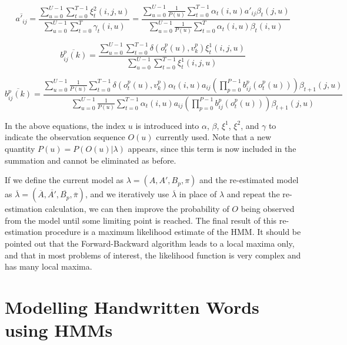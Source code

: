 \documentclass{article}[14pt, oneside, a4paper, times]
\begin{document}
\begin{equation}
    \overline{a'_{ij}} =
        \frac{ \sum_{u=0}^{U-1} \sum_{t=0}^{T-1} \xi_t^2(i,j,u) }
             { \sum_{u=0}^{U-1} \sum_{t=0}^T \gamma_t(i,u)} =
        \frac{ \sum_{u=0}^{U-1} \frac{1} {P(u)} \sum_{t=0}^{T-1} \alpha_t(i,u) a'_{ij} \beta_t(j,u) }
             { \sum_{u=0}^{U-1} \frac{1} {P(u)} \sum_{t=0}^T \alpha_t(i,u) \beta_t(i,u) }
    \label{EQ:a2-3}
\end{equation}

\begin{equation}
    \overline{b_{ij}^p(k)} =
        \frac{ \sum_{u=0}^{U-1} \sum_{t=0}^{T-1} \delta(o_t^p(u), v_k^p) \xi_t^1(i,j,u) }
             { \sum_{u=0}^{U-1} \sum_{t=0}^{T-1} \xi_t^1(i,j,u)}
    \label{EQ:b-3}
\end{equation}

$$\overline{b_{ij}^p(k)} =
    \frac{ \sum_{u=0}^{U-1} \frac{1} {P(u)} \sum_{t=0}^{T-1} \delta(o_t^p(u), v_k^p)
                       \alpha_t(i,u) a_{ij} \left( \prod_{p=0}^{P-1} b_{ij}^p(o_t^p(u)) \right) \beta_{t+1}(j,u) }
         { \sum_{u=0}^{U-1} \frac{1} {P(u)} \sum_{t=0}^{T-1}
                       \alpha_t(i,u) a_{ij} \left( \prod_{p=0}^{P-1} b_{ij}^p(o_t^p(u)) \right) \beta_{t+1}(j,u)}$$

In the above equations, the index $u$ is introduced into $\alpha$, $\beta$,
$\xi^1$, $\xi^2$, and $\gamma$ to indicate the observation sequence $O(u)$
currently used. Note that a new quantity $P(u) = P(O(u) | \lambda)$ appears,
since this term is now included in the summation and cannot be eliminated as
before.

If we define the current model as $\lambda = (A, A', B_p, \pi)$ and the
re-estimated model as $\overline{\lambda} = ( \overline{A}, \overline{A'},
\overline{B_p}, \overline{\pi})$, and we iteratively use $\overline{\lambda}$
in place of $\lambda$ and repeat the re-estimation calculation, we can then
improve the probability of $O$ being observed from the model until some
limiting point is reached. The final result of this re-estimation procedure is
a maximum likelihood estimate of the HMM. It should be pointed out that the
Forward-Backward algorithm leads to a local maxima only, and that in most
problems of interest, the likelihood function is very complex and has many
local maxima.

\section{Modelling Handwritten Words using HMMs}
\label{modelling:Sec}
\end{document}
